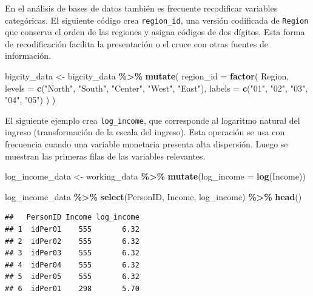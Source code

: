 \documentclass[
  spanish,
  12pt,
]{book}
\newenvironment{Shaded}{\begin{snugshade}}{\end{snugshade}}
\newcommand{\AttributeTok}[1]{\textcolor[rgb]{0.13,0.29,0.53}{#1}}
\newcommand{\FunctionTok}[1]{\textcolor[rgb]{0.13,0.29,0.53}{\textbf{#1}}}
\newcommand{\NormalTok}[1]{#1}
\newcommand{\OtherTok}[1]{\textcolor[rgb]{0.56,0.35,0.01}{#1}}
\newcommand{\SpecialCharTok}[1]{\textcolor[rgb]{0.81,0.36,0.00}{\textbf{#1}}}
\newcommand{\StringTok}[1]{\textcolor[rgb]{0.31,0.60,0.02}{#1}}
\begin{document}
En el análisis de bases de datos también es frecuente recodificar variables categóricas. El siguiente código crea \texttt{region\_id}, una versión codificada de \texttt{Region} que conserva el orden de las regiones y asigna códigos de dos dígitos. Esta forma de recodificación facilita la presentación o el cruce con otras fuentes de información.

\begin{Shaded}
\begin{Highlighting}[]
\NormalTok{bigcity\_data }\OtherTok{\textless{}{-}}\NormalTok{ bigcity\_data }\SpecialCharTok{\%\textgreater{}\%}
  \FunctionTok{mutate}\NormalTok{(}
    \AttributeTok{region\_id =} \FunctionTok{factor}\NormalTok{(}
\NormalTok{      Region,}
      \AttributeTok{levels =} \FunctionTok{c}\NormalTok{(}\StringTok{"North"}\NormalTok{, }\StringTok{"South"}\NormalTok{, }\StringTok{"Center"}\NormalTok{, }\StringTok{"West"}\NormalTok{, }\StringTok{"East"}\NormalTok{),}
      \AttributeTok{labels =} \FunctionTok{c}\NormalTok{(}\StringTok{"01"}\NormalTok{, }\StringTok{"02"}\NormalTok{, }\StringTok{"03"}\NormalTok{, }\StringTok{"04"}\NormalTok{, }\StringTok{"05"}\NormalTok{)}
\NormalTok{    )}
\NormalTok{  )}
\end{Highlighting}
\end{Shaded}

El siguiente ejemplo crea \texttt{log\_income}, que corresponde al logaritmo natural del ingreso (transformación de la escala del ingreso). Esta operación se usa con frecuencia cuando una variable monetaria presenta alta dispersión. Luego se muestran las primeras filas de las variables relevantes.

\begin{Shaded}
\begin{Highlighting}[]
\NormalTok{log\_income\_data }\OtherTok{\textless{}{-}}\NormalTok{ working\_data }\SpecialCharTok{\%\textgreater{}\%}
  \FunctionTok{mutate}\NormalTok{(}\AttributeTok{log\_income =} \FunctionTok{log}\NormalTok{(Income))}

\NormalTok{log\_income\_data }\SpecialCharTok{\%\textgreater{}\%}
  \FunctionTok{select}\NormalTok{(PersonID, Income, log\_income) }\SpecialCharTok{\%\textgreater{}\%}
  \FunctionTok{head}\NormalTok{()}
\end{Highlighting}
\end{Shaded}

\begin{verbatim}
##   PersonID Income log_income
## 1  idPer01    555       6.32
## 2  idPer02    555       6.32
## 3  idPer03    555       6.32
## 4  idPer04    555       6.32
## 5  idPer05    555       6.32
## 6  idPer01    298       5.70
\end{verbatim}
\end{document}
